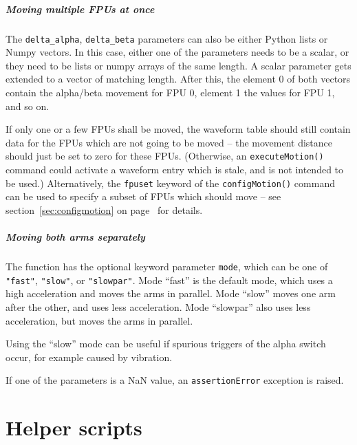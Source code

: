 \documentclass[fontsize=12,a4paper]{scrreprt}
\begin{document}
\paragraph{Moving multiple FPUs at once}
 The
\verb+delta_alpha+, \verb+delta_beta+ parameters can also be either
Python lists or Numpy vectors. In this case, either one of the
parameters needs to be a scalar, or they need to be lists or numpy
arrays of the same length. A scalar parameter gets extended to a
vector of matching length. After this, the element 0 of both vectors
contain the alpha/beta movement for FPU 0, element 1 the values for
FPU 1, and so on.

If only one or a few FPUs shall be moved, the waveform table should
still contain data for the FPUs which are not going to be moved -- the
movement distance should just be set to zero for these FPUs.
(Otherwise, an \texttt{executeMotion()} command could activate a
waveform entry which is stale, and is not intended to be used.)
Alternatively, the \texttt{fpuset} keyword of the
\texttt{configMotion()} command can be used to specify a subset of FPUs
which should move -- see section~\ref{sec:configmotion} on
page~\pageref{sec:configmotion} for details.

\paragraph{Moving both arms separately}

The function has the optional keyword parameter \texttt{mode}, which
can be one of \texttt{"fast"}, \texttt{"slow"}, or \texttt{"slowpar"}.
Mode ``fast'' is the default mode, which uses a high acceleration and
moves the arms in parallel. Mode ``slow'' moves one arm after the
other, and uses less acceleration. Mode ``slowpar'' also uses less
acceleration, but moves the arms in parallel.

Using the ``slow'' mode can be useful if spurious triggers of the
alpha switch occur, for example caused by vibration.

If one of the parameters is a NaN value, an \texttt{assertionError}
exception is raised.

\chapter{Helper scripts}
\end{document}
